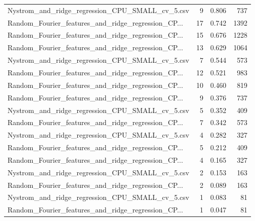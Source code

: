 \begin{tabularx}{\textwidth}{lrrr}
   Nystrom\_and\_ridge\_regression\_CPU\_SMALL\_cv\_5.csv &        9 &               0.806 &           737 \\
Random\_Fourier\_features\_and\_ridge\_regression\_CP... &       17 &               0.742 &          1392 \\
Random\_Fourier\_features\_and\_ridge\_regression\_CP... &       15 &               0.676 &          1228 \\
Random\_Fourier\_features\_and\_ridge\_regression\_CP... &       13 &               0.629 &          1064 \\
   Nystrom\_and\_ridge\_regression\_CPU\_SMALL\_cv\_5.csv &        7 &               0.544 &           573 \\
Random\_Fourier\_features\_and\_ridge\_regression\_CP... &       12 &               0.521 &           983 \\
Random\_Fourier\_features\_and\_ridge\_regression\_CP... &       10 &               0.460 &           819 \\
Random\_Fourier\_features\_and\_ridge\_regression\_CP... &        9 &               0.376 &           737 \\
   Nystrom\_and\_ridge\_regression\_CPU\_SMALL\_cv\_5.csv &        5 &               0.352 &           409 \\
Random\_Fourier\_features\_and\_ridge\_regression\_CP... &        7 &               0.342 &           573 \\
   Nystrom\_and\_ridge\_regression\_CPU\_SMALL\_cv\_5.csv &        4 &               0.282 &           327 \\
Random\_Fourier\_features\_and\_ridge\_regression\_CP... &        5 &               0.212 &           409 \\
Random\_Fourier\_features\_and\_ridge\_regression\_CP... &        4 &               0.165 &           327 \\
   Nystrom\_and\_ridge\_regression\_CPU\_SMALL\_cv\_5.csv &        2 &               0.153 &           163 \\
Random\_Fourier\_features\_and\_ridge\_regression\_CP... &        2 &               0.089 &           163 \\
   Nystrom\_and\_ridge\_regression\_CPU\_SMALL\_cv\_5.csv &        1 &               0.083 &            81 \\
Random\_Fourier\_features\_and\_ridge\_regression\_CP... &        1 &               0.047 &            81 \\
\bottomrule
\end{tabularx}
